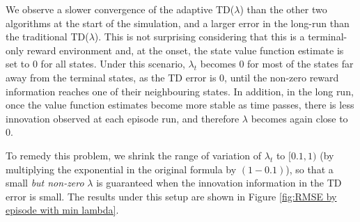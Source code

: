 \documentclass[11pt,A4paper]{article}
\begin{document}
We observe a slower convergence of the adaptive TD($\lambda$) than the other two algorithms at the start of the simulation, and a larger error in the long-run than the traditional TD($\lambda$). This is not surprising considering that this is a terminal-only reward environment and, at the onset, the state value function estimate is set to 0 for all states. Under this scenario, $\lambda_t$ becomes 0 for most of the states far away from the terminal states, as the TD error is 0, until the non-zero reward information reaches one of their neighbouring states. In addition, in the long run, once the value function estimates become more stable as time passes, there is less innovation observed at each episode run, and therefore $\lambda$ becomes again close to 0.

To remedy this problem, we shrink the range of variation of $\lambda_t$ to  $[0.1, 1)$ (by multiplying the exponential in the original formula by $(1 - 0.1)$), so that a small \emph{but non-zero} $\lambda$ is guaranteed when the innovation information in the TD error is small. The results under this setup are shown in Figure \ref{fig:RMSE by episode with min lambda}.

\end{document}
